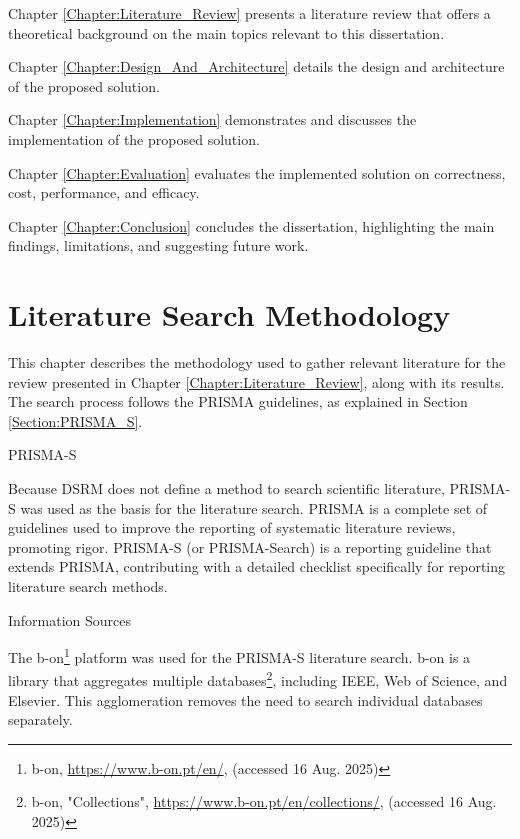 \documentclass[12pt, reqno]{amsbook}
\makeatletter
\def\section{\@startsection{section}{1}%
      \z@{.5\linespacing\@plus.7\linespacing}{.25\linespacing}%
      {\normalfont\bfseries\flushleft}}
\theoremstyle{definition}
\theoremstyle{definition}
\numberwithin{section}{chapter}
\numberwithin{table}{chapter}
\numberwithin{figure}{chapter}
\makeatother
\begin{document}
Chapter \ref{Chapter:Literature_Review} presents a literature review that offers a theoretical background on the main topics relevant to this dissertation.

Chapter \ref{Chapter:Design_And_Architecture} details the design and architecture of the proposed solution.

Chapter \ref{Chapter:Implementation} demonstrates and discusses the implementation of the proposed solution.

Chapter \ref{Chapter:Evaluation} evaluates the implemented solution on correctness, cost, performance, and efficacy.

Chapter \ref{Chapter:Conclusion} concludes the dissertation, highlighting the main findings, limitations, and suggesting future work.


\chapter{Literature Search Methodology}
\label{Chapter:Literature_Search_Methodology}

This chapter describes the methodology used to gather relevant literature for the review presented in Chapter \ref{Chapter:Literature_Review}, along with its results. The search process follows the \ac{PRISMA} guidelines, as explained in Section \ref{Section:PRISMA_S}.

\section{PRISMA-S}
\label{Section:PRISMA_S}

Because \ac{DSRM} does not define a method to search scientific literature, PRISMA-S was used as the basis for the literature search. \ac{PRISMA} is a complete set of guidelines used to improve the reporting of systematic literature reviews, promoting rigor. PRISMA-S (or PRISMA-Search) is a reporting guideline that extends PRISMA, contributing with a detailed checklist specifically for reporting literature search methods.

\section{Information Sources}
\label{Section:Information_Sources}

The b-on\footnote{b-on, \url{https://www.b-on.pt/en/}, (accessed 16 Aug. 2025)} platform was used for the PRISMA-S literature search. b-on is a library that aggregates multiple databases\footnote{b-on, "Collections", \url{https://www.b-on.pt/en/collections/}, (accessed 16 Aug. 2025)}, including IEEE, Web of Science, and Elsevier. This agglomeration removes the need to search individual databases separately.
\end{document}
